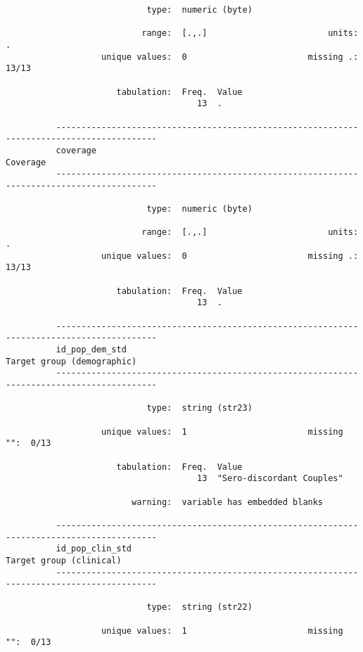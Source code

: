 \documentclass{article}
\begin{document}
\begin{verbatim}
                            type:  numeric (byte)
          
                           range:  [.,.]                        units:  .
                   unique values:  0                        missing .:  13/13
          
                      tabulation:  Freq.  Value
                                      13  .
          
          ------------------------------------------------------------------------------------------
          coverage                                                                          Coverage
          ------------------------------------------------------------------------------------------
          
                            type:  numeric (byte)
          
                           range:  [.,.]                        units:  .
                   unique values:  0                        missing .:  13/13
          
                      tabulation:  Freq.  Value
                                      13  .
          
          ------------------------------------------------------------------------------------------
          id_pop_dem_std                                                  Target group (demographic)
          ------------------------------------------------------------------------------------------
          
                            type:  string (str23)
          
                   unique values:  1                        missing "":  0/13
          
                      tabulation:  Freq.  Value
                                      13  "Sero-discordant Couples"
          
                         warning:  variable has embedded blanks
          
          ------------------------------------------------------------------------------------------
          id_pop_clin_std                                                    Target group (clinical)
          ------------------------------------------------------------------------------------------
          
                            type:  string (str22)
          
                   unique values:  1                        missing "":  0/13
          

\end{verbatim}
\end{document}
